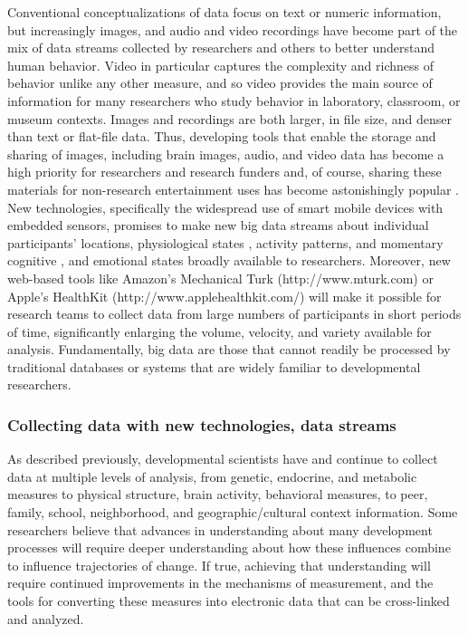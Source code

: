 \documentclass[letterpaper,man,apacite]{apa6}
\begin{document}
Conventional conceptualizations of data focus on text or numeric information, but increasingly images, and audio \cite{Mehl} and video recordings have become part of the mix of data streams collected by researchers and others to better understand human behavior.
Video in particular captures the complexity and richness of behavior unlike any other measure, and so video provides the main source of information for many researchers who study behavior in laboratory, classroom, or museum contexts. 
Images and recordings are both larger, in file size, and denser than text or flat-file data. 
Thus, developing tools that enable the storage and sharing of images, including brain images, audio, and video data has become a high priority for researchers and research funders \cite{Databrary2015, openfmri.org} and, of course, sharing these materials for non-research entertainment uses has become astonishingly popular \cite{YouTube2015}.
New technologies, specifically the widespread use of smart mobile devices with embedded sensors, promises to make new big data streams about individual participants' locations, physiological states \cite{Picard}, activity patterns, and momentary cognitive \cite{Sliwinski}, and emotional states broadly available to researchers.
Moreover, new web-based tools like Amazon's Mechanical Turk (http://www.mturk.com) or Apple's HealthKit (http://www.applehealthkit.com/) will make it possible for research teams to collect data from large numbers of participants in short periods of time, significantly enlarging the volume, velocity, and variety available for analysis.   
Fundamentally, big data are those that cannot readily be processed by traditional databases or systems that are widely familiar to developmental researchers.

\subsubsection{Collecting data with new technologies, data streams}

As described previously, developmental scientists have and continue to collect data at multiple levels of analysis, from genetic, endocrine, and metabolic measures to physical structure, brain activity, behavioral measures, to peer, family, school, neighborhood, and geographic/cultural context information.
Some researchers believe that advances in understanding about many development processes will require deeper understanding about how these influences combine to influence trajectories of change.
If true, achieving that understanding will require continued improvements in the mechanisms of measurement, and the tools for converting these measures into electronic data that can be cross-linked and analyzed.
\end{document}
